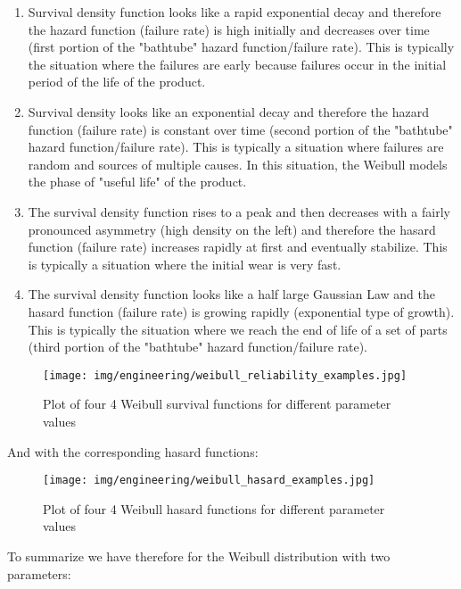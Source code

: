 	\begin{enumerate}
		\item Survival density function looks like a rapid exponential decay and therefore the hazard function (failure rate) is high initially and decreases over time (first portion of the "bathtube" hazard function/failure rate). This is typically the situation where the failures are early because  failures occur in the initial period of the life of the product.
		
		\item Survival density looks like an exponential decay and therefore the hazard function (failure rate) is constant over time (second portion of the "bathtube" hazard function/failure rate). This is typically a situation where failures are random and sources of multiple causes. In this situation, the Weibull models the phase of "useful life" of the product.
		
		\item The survival density function rises to a peak and then decreases with a fairly pronounced asymmetry (high density on the left) and therefore the hasard function (failure rate) increases rapidly at first and eventually stabilize. This is typically a situation where the initial wear is very fast.
		
		\item The survival density function looks like a half large Gaussian Law and the hasard function (failure rate) is growing rapidly (exponential type of growth). This is typically the situation where we reach the end of life of a set of parts (third portion of the "bathtube" hazard function/failure rate).
	\end{enumerate}
	\begin{figure}[H]
		\begin{center}
			\texttt{[image: img/engineering/weibull\_reliability\_examples.jpg]}
		\end{center}	
		\caption{Plot of four 4 Weibull survival functions for different parameter values}
	\end{figure}
	And with the corresponding hasard functions:
	\begin{figure}[H]
		\begin{center}
			\texttt{[image: img/engineering/weibull\_hasard\_examples.jpg]}
		\end{center}	
		\caption{Plot of four 4 Weibull hasard functions for different parameter values}
	\end{figure}
	To summarize  we have therefore for the Weibull distribution with two parameters:
	
